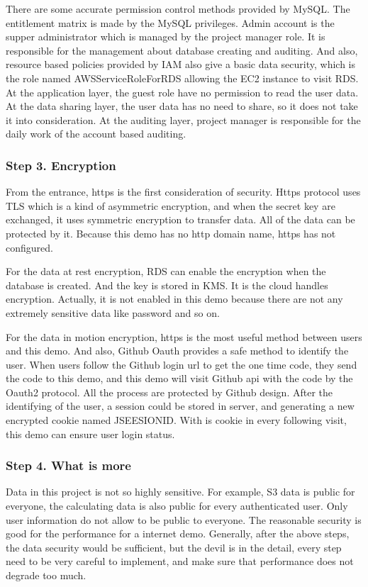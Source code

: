 \documentclass[conference]{IEEEtran}
\begin{document}
There are some accurate permission control methods provided by MySQL. The entitlement matrix is made by the MySQL privileges. Admin account is the supper administrator 
which is managed by the project manager role. It is responsible for the management about database creating and auditing. And also, resource based policies provided 
by IAM also give a basic data security, which is the role named AWSServiceRoleForRDS allowing the EC2 instance to visit RDS. At the application layer, the guest role 
have no permission to read the user data. At the data sharing layer, the user data has no need to share, so it does not take it into consideration. At the auditing layer, 
project manager is responsible for the daily work of the account based auditing.

\subsubsection{Step 3. Encryption}

From the entrance, https is the first consideration of security. Https protocol uses TLS which is a kind of asymmetric encryption, and when the secret key are exchanged, 
it uses symmetric encryption to transfer data. All of the data can be protected by it. Because this demo has no http domain name, https has not configured.

For the data at rest encryption, RDS can enable the encryption when the database is created. And the key is stored in KMS. It is the cloud handles encryption. Actually, it 
is not enabled in this demo because there are not any extremely sensitive data like password and so on.

For the data in motion encryption, https is the most useful method between users and this demo. And also, Github Oauth provides a safe method to identify the user. When 
users follow the Github login url to get the one time code, they send the code to this demo, and this demo will visit Github api with the code by the Oauth2 protocol. All the 
process are protected by Github design. After the identifying of the user, a session could be stored in server, and generating a new encrypted cookie named JSEESIONID. With is 
cookie in every following visit, this demo can ensure user login status.

\subsubsection{Step 4. What is more}

Data in this project is not so highly sensitive. For example, S3 data is public for everyone, the calculating data is also public for every authenticated user. Only user 
information do not allow to be public to everyone. The reasonable security is good for the performance for a internet demo. Generally, after the above steps, the data 
security would be sufficient, but the devil is in the detail, every step need to be very careful to implement, and make sure that performance does not degrade too much.
\end{document}
